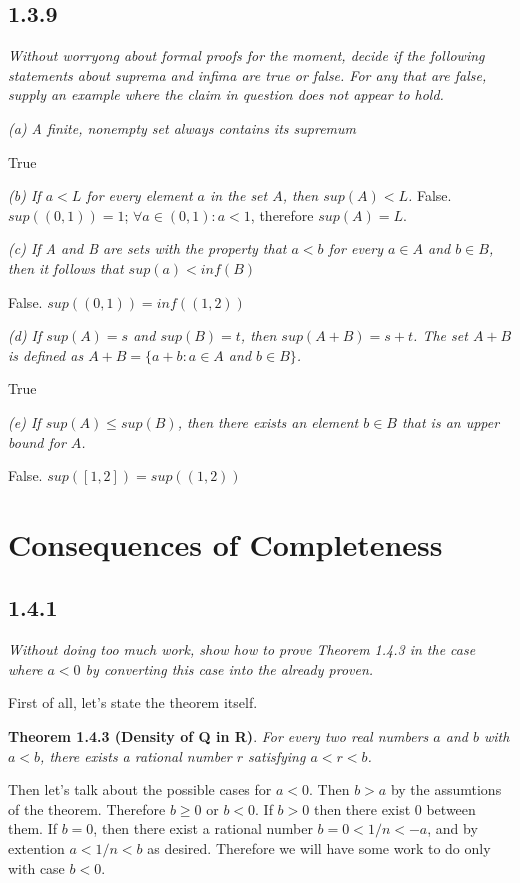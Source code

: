 \documentclass[11pt,oneside,titlepage]{book}
\begin{document}
\subsection*{1.3.9}
\textit{Without worryong about formal proofs for the moment, decide if the
  following statements about suprema and infima are true or false. For any that
  are false, supply an example where the claim in question does not appear to
  hold.}

\textit{(a) A finite, nonempty set always contains its supremum}

True

\textit{(b) If $a < L$ for every element $a$ in the set $A$, then $sup(A) <
  L$.}
False. $sup((0, 1)) = 1$; $\forall a \in (0, 1): a < 1$, therefore $sup(A) = L$.

\textit{(c) If A and B are sets with the property that $a < b$ for every
  $a \in A$ and $b \in B$, then it follows that $sup(a) < inf(B)$}

False. $sup((0,1)) = inf((1, 2))$

\textit{(d) If $sup(A) = s$ and $sup(B) = t$, then $sup(A + B) = s + t$. The
  set $A + B$ is defined as $A + B = \{a + b: a \in A$ and $b \in B\}$.}

True

\textit{(e) If $sup(A) \leq sup(B)$, then there exists an element $b \in B$
  that is an upper bound for $A$.}

False. $sup([1, 2]) = sup((1, 2))$

\section{Consequences of Completeness}

\subsection*{1.4.1}
\textit{Without doing too much work, show how to prove Theorem 1.4.3 in the
  case where $a < 0$ by converting this case into the already proven.}

First of all, let's state the theorem itself.

\textbf{Theorem 1.4.3 (Density of Q in R)}.
\textit{For every two real numbers $a$ and $b$ with $a < b$, there exists a
  rational number $r$ satisfying $a < r < b$.}

Then let's talk about the possible cases for $a < 0$. Then $b > a$ by the
assumtions of the theorem. Therefore $b \geq 0$ or $b < 0$. If $b > 0$ then
there exist 0 between them. If $b = 0$, then there exist a rational number
$b = 0 < 1/n < -a$, and by extention $a < 1/n < b$ as desired. Therefore we
will have some work to do  only with case $b < 0$.
\end{document}

